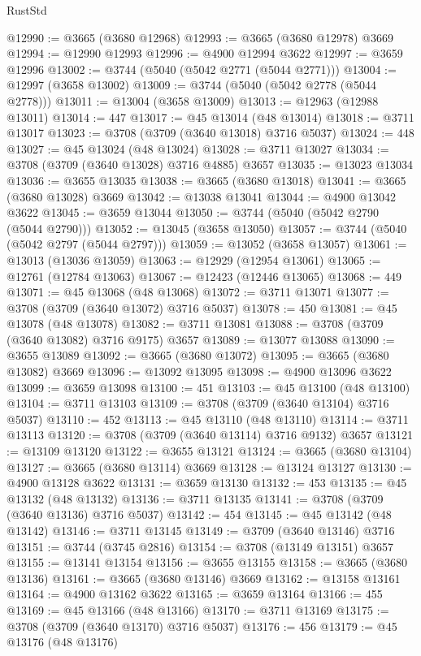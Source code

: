 \begin{lexlean}{RustStd}
\begin{coremodule}
@12990 := @3665 (@3680 @12968)
@12993 := @3665 (@3680 @12978) @3669
@12994 := @12990 @12993
@12996 := @4900 @12994 @3622
@12997 := @3659 @12996
@13002 := @3744 (@5040 (@5042 @2771 (@5044 @2771)))
@13004 := @12997 (@3658 @13002)
@13009 := @3744 (@5040 (@5042 @2778 (@5044 @2778)))
@13011 := @13004 (@3658 @13009)
@13013 := @12963 (@12988 @13011)
@13014 := 447
@13017 := @45 @13014 (@48 @13014)
@13018 := @3711 @13017
@13023 := @3708 (@3709 (@3640 @13018) @3716 @5037)
@13024 := 448
@13027 := @45 @13024 (@48 @13024)
@13028 := @3711 @13027
@13034 := @3708 (@3709 (@3640 @13028) @3716 @4885) @3657
@13035 := @13023 @13034
@13036 := @3655 @13035
@13038 := @3665 (@3680 @13018)
@13041 := @3665 (@3680 @13028) @3669
@13042 := @13038 @13041
@13044 := @4900 @13042 @3622
@13045 := @3659 @13044
@13050 := @3744 (@5040 (@5042 @2790 (@5044 @2790)))
@13052 := @13045 (@3658 @13050)
@13057 := @3744 (@5040 (@5042 @2797 (@5044 @2797)))
@13059 := @13052 (@3658 @13057)
@13061 := @13013 (@13036 @13059)
@13063 := @12929 (@12954 @13061)
@13065 := @12761 (@12784 @13063)
@13067 := @12423 (@12446 @13065)
@13068 := 449
@13071 := @45 @13068 (@48 @13068)
@13072 := @3711 @13071
@13077 := @3708 (@3709 (@3640 @13072) @3716 @5037)
@13078 := 450
@13081 := @45 @13078 (@48 @13078)
@13082 := @3711 @13081
@13088 := @3708 (@3709 (@3640 @13082) @3716 @9175) @3657
@13089 := @13077 @13088
@13090 := @3655 @13089
@13092 := @3665 (@3680 @13072)
@13095 := @3665 (@3680 @13082) @3669
@13096 := @13092 @13095
@13098 := @4900 @13096 @3622
@13099 := @3659 @13098
@13100 := 451
@13103 := @45 @13100 (@48 @13100)
@13104 := @3711 @13103
@13109 := @3708 (@3709 (@3640 @13104) @3716 @5037)
@13110 := 452
@13113 := @45 @13110 (@48 @13110)
@13114 := @3711 @13113
@13120 := @3708 (@3709 (@3640 @13114) @3716 @9132) @3657
@13121 := @13109 @13120
@13122 := @3655 @13121
@13124 := @3665 (@3680 @13104)
@13127 := @3665 (@3680 @13114) @3669
@13128 := @13124 @13127
@13130 := @4900 @13128 @3622
@13131 := @3659 @13130
@13132 := 453
@13135 := @45 @13132 (@48 @13132)
@13136 := @3711 @13135
@13141 := @3708 (@3709 (@3640 @13136) @3716 @5037)
@13142 := 454
@13145 := @45 @13142 (@48 @13142)
@13146 := @3711 @13145
@13149 := @3709 (@3640 @13146) @3716
@13151 := @3744 (@3745 @2816)
@13154 := @3708 (@13149 @13151) @3657
@13155 := @13141 @13154
@13156 := @3655 @13155
@13158 := @3665 (@3680 @13136)
@13161 := @3665 (@3680 @13146) @3669
@13162 := @13158 @13161
@13164 := @4900 @13162 @3622
@13165 := @3659 @13164
@13166 := 455
@13169 := @45 @13166 (@48 @13166)
@13170 := @3711 @13169
@13175 := @3708 (@3709 (@3640 @13170) @3716 @5037)
@13176 := 456
@13179 := @45 @13176 (@48 @13176)

\end{coremodule}
\end{lexlean}
